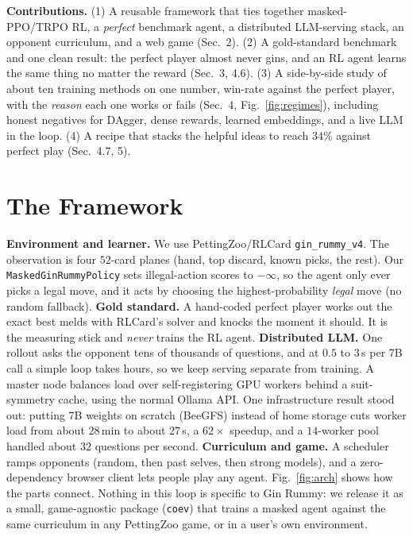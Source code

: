 \documentclass[10pt]{article}
\begin{document}
\noindent\textbf{Contributions.} (1) A reusable framework that ties together masked-PPO/TRPO RL, a
\emph{perfect} benchmark agent, a distributed LLM-serving stack, an opponent curriculum, and a web
game (Sec.~2). (2) A gold-standard benchmark and one clean result: the perfect player almost never
gins, and an RL agent learns the same thing no matter the reward (Sec.~3, 4.6). (3) A side-by-side
study of about ten training methods on one number, win-rate against the perfect player, with the
\emph{reason} each one works or fails (Sec.~4, Fig.~\ref{fig:regimes}), including honest negatives
for DAgger, dense rewards, learned embeddings, and a live LLM in the loop. (4) A recipe that stacks
the helpful ideas to reach $34\%$ against perfect play (Sec.~4.7, 5).

\section{The Framework}
\textbf{Environment and learner.} We use PettingZoo/RLCard \texttt{gin\_rummy\_v4}. The observation
is four $52$-card planes (hand, top discard, known picks, the rest). Our \texttt{MaskedGinRummyPolicy}
sets illegal-action scores to $-\infty$, so the agent only ever picks a legal move, and it acts by
choosing the highest-probability \emph{legal} move (no random fallback). \textbf{Gold standard.} A
hand-coded perfect player works out the exact best melds with RLCard's solver and knocks the moment
it should. It is the measuring stick and \emph{never} trains the RL agent. \textbf{Distributed LLM.}
One rollout asks the opponent tens of thousands of questions, and at $0.5$ to $3$\,s per 7B call a
simple loop takes hours, so we keep serving separate from training. A master node balances load over
self-registering GPU workers behind a suit-symmetry cache, using the normal Ollama API. One
infrastructure result stood out: putting 7B weights on scratch (BeeGFS) instead of home storage cuts
worker load from about $28$\,min to about $27$\,s, a $62\times$ speedup, and a $14$-worker pool
handled about $32$ questions per second. \textbf{Curriculum and game.} A scheduler ramps opponents
(random, then past selves, then strong models), and a zero-dependency browser client lets people play
any agent. Fig.~\ref{fig:arch} shows how the parts connect. Nothing in this loop is specific to Gin
Rummy: we release it as a small, game-agnostic package (\texttt{coev}) that trains a masked agent
against the same curriculum in any PettingZoo game, or in a user's own environment.
\end{document}
